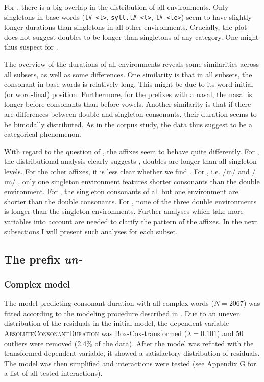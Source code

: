 
For , there is a big overlap in the distribution of all environments. Only singletons in base words (\texttt{l\#-<l>}, \texttt{syll.l\#-<l>}, \texttt{l\#-<le>}) seem to have slightly longer durations than singletons in all other environments. Crucially, the plot does not suggest doubles to be longer than singletons of any category. One might thus suspect  for . 

The overview of the durations of all environments reveals some similarities across all subsets, as well as some differences. 
One similarity is that in all subsets, the consonant in base words is relatively long. This might be due to its word-initial (or word-final) position. 
Furthermore, for the prefixes with a nasal, the nasal is longer before consonants than before vowels. 
Another similarity is that if there are differences between double and singleton consonants, their duration seems to be bimodally distributed. As in the corpus study, the data thus suggest  to be a categorical phenomenon.

With regard to the question of , the affixes seem to behave quite differently. For , the distributional analysis clearly suggests , doubles are longer than all singleton levels. 
For the other affixes, it is less clear whether we find . For , i.e. /ɪn/ and /ɪm/ , only one singleton environment features shorter consonants than the double environment.
For , the singleton consonants of all but one environment are shorter than the double consonants. 
For , none of the three double environments is longer than the singleton environments. Further analyses which take more variables into account are needed to clarify the  pattern of the affixes. 
 In the next subsections I will present such analyses for each subset.


\subsection{The prefix \textit{un-}} \label{un experiment}

\subsubsection{Complex model}


The model predicting consonant duration with all complex words ($N=2067$) was fitted according to the modeling procedure described in . Due to an uneven distribution of the residuals in the initial model, the dependent variable \textsc{AbsoluteConsonantDuration} was Box-Cox-transformed ($\lambda = 0.101$) and 50 outliers were removed (2.4\% of the data).
 After the model was refitted with the transformed dependent variable, it showed a satisfactory distribution of residuals.  The model was then simplified and interactions were tested (see \hyperref[Appendix G Summaries of tested interactions in experimental study]{Appendix G} for a list of all tested interactions).
 
